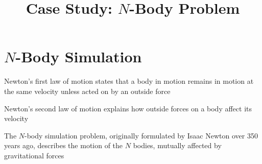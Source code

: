 \documentclass[8pt,a4paper,compress]{beamer}
\title{Case Study: $N$-Body Problem}
\date{}
\begin{document}
\begin{frame}
\vfill
\titlepage
\end{frame}

\section{$N$-Body Simulation}
\begin{frame}[fragile]
\pause

Newton's first law of motion states that a body in motion remains in motion at the same velocity unless acted on by an outside force

\pause
\bigskip

Newton's second law of motion explains how outside forces on a body affect its velocity

\pause
\bigskip

The $N$-body simulation problem, originally formulated by Isaac Newton over 350 years ago, describes the motion of the $N$ bodies, mutually affected by gravitational forces
\end{frame}
\end{document}
